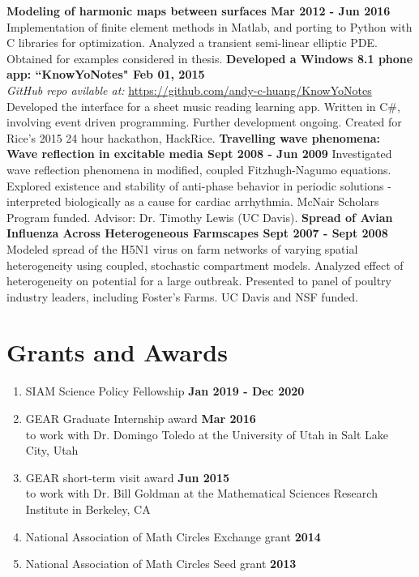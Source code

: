 \documentclass[margin,line]{res}
\begin{document}
\begin{resume}
{\bf Modeling of harmonic maps between surfaces \hfill Mar 2012 - Jun 2016}\\
Implementation of finite element methods in Matlab, and porting to Python with C libraries for optimization. Analyzed a transient semi-linear elliptic PDE. Obtained for examples considered in thesis.
\vskip -5pt
{\bf Developed a Windows 8.1 phone app: ``KnowYoNotes" \hfill Feb 01, 2015}\\
\emph{GitHub repo avilable at: }\url{https://github.com/andy-c-huang/KnowYoNotes}\\
Developed the interface for a sheet music reading learning app. Written in C\#, involving event driven programming. Further development ongoing. Created for Rice's 2015 24 hour hackathon, HackRice.
\vskip -5pt
{\bf Travelling wave phenomena: Wave reflection in excitable media \hfill Sept 2008 - Jun 2009} \newline
Investigated wave reflection phenomena in modified, coupled Fitzhugh-Nagumo equations. Explored existence and stability of anti-phase behavior in periodic solutions - interpreted biologically as a cause for cardiac arrhythmia. McNair Scholars Program funded. Advisor: Dr. Timothy Lewis (UC Davis).
\vskip -5pt
{\bf Spread of Avian Influenza Across Heterogeneous Farmscapes \hfill Sept 2007 - Sept 2008} \\
Modeled spread of the H5N1 virus on farm networks of varying spatial heterogeneity using coupled, stochastic compartment models. Analyzed effect of heterogeneity on potential for a large outbreak. Presented to panel of poultry industry leaders, including Foster's Farms. UC Davis and NSF funded.

\section{\sc Grants and Awards}
\begin{enumerate}
  
\item SIAM Science Policy Fellowship \hfill {\bf Jan 2019 - Dec 2020}
\item GEAR Graduate Internship award \hfill {\bf Mar 2016} \\
to work with Dr. Domingo Toledo at the University of Utah in Salt Lake City, Utah
\item GEAR short-term visit award \hfill {\bf Jun 2015} \\
to work with Dr. Bill Goldman at the Mathematical Sciences Research Institute in Berkeley, CA
\item National Association of Math Circles Exchange grant \hfill {\bf 2014}
\item National Association of Math Circles Seed grant \hfill {\bf 2013}
\end{enumerate}


\end{resume}
\end{document}
